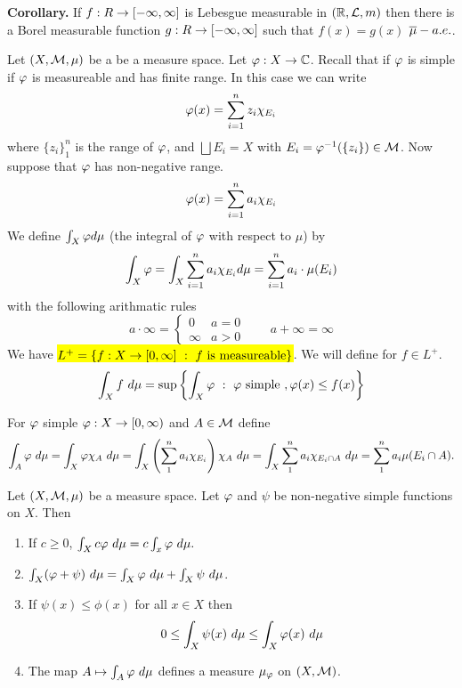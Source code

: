 \vs
\textbf{Corollary.} If $f:R\rightarrow [-\infty, \infty]$ is Lebesgue measurable in $(\mathbb{R}, \mathcal{L}, m)$ then there is a Borel measurable function $g:R\rightarrow [-\infty, \infty]$ such that $f(x) = g(x)$ $\overline\mu-a.e.$.


\dfn Let $(X, \mathcal{M}, \mu)$ be a be a measure space. Let $\varphi:X\rightarrow \mathbb{C}$. Recall that if $\varphi$ is simple if $\varphi$ is measureable and has finite range. In this case we can write
\[\varphi(x) = \sum_{i = 1}^n z_i\chi_{E_i}\]
where $\{z_i\}_1^n$ is the range of $\varphi$, and $\bigsqcup E_i = X$ with $E_i = \varphi^{-1}(\{z_i\})\in \mathcal{M}$. Now suppose that $\varphi$ has non-negative range. 
\[\varphi(x) = \sum_{i = 1}^n a_i\chi_{E_i}\]
We define $\int_X \varphi d\mu$ (the integral of $\varphi$ with respect to $\mu$) by
\[\int_X \varphi = \int_X\sum_{i=1}^n a_i\chi_{E_i}d\mu = \sum_{i = 1}^n a_i\cdot \mu(E_i)\]
with the following arithmatic rules
\[a\cdot \infty = \begin{cases} 0 & a = 0 \\ \infty  & a > 0\end{cases} \qquad a + \infty = \infty\]
We have \hl{$L^+ = \{f:X\rightarrow [0,\infty]\ :\ f \text{ is measureable}\}$}. We will define for $f\in L^+$. 
\[\int_X f\ d\mu = \sup\left\{\int_X\varphi\ : \ \varphi \text{ simple }, \varphi(x) \leq f(x)\right\}\]

\vs

\dfn For $\varphi$ simple $\varphi:X\rightarrow [0,\infty)$ and $A\in \mathcal{M}$ define
\[\int_A \varphi\ d\mu = \int_X\varphi\chi_A\ d\mu = \int_X\left(\sum_1^n a_i\chi_{E_i}\right) \chi_A\  d\mu = \int_X\sum_1^n a_i \chi_{E_i\cap A}\ d\mu = \sum_1^n a_i \mu(E_i\cap A).\]

\vs

\begin{prop}
Let $(X,\mathcal{M},\mu)$ be a measure space. Let $\varphi$ and $\psi$ be non-negative simple functions on $X$. Then 
\begin{enumerate}[\hh (a)]
    \item If $c\geq 0$, $\int_X c\vphi\ d\mu = c\int_x\vphi\ d\mu.$
    \item $\int_X(\varphi + \psi)\ d\mu = \int_X\varphi\ d\mu + \int_X \psi\ d\mu$.
    \item If $\psi(x) \leq \phi(x)$ for all $x\in X$ then 
    \[0\leq \int_X\psi(x)\ d\mu \leq \int_X \varphi(x)\ d\mu\]
    \item The map $A\mapsto \int_A\vphi\ d\mu$ defines a measure $\mu_\varphi$ on $(X, \mathcal{M})$.
\end{enumerate}
\end{prop}


